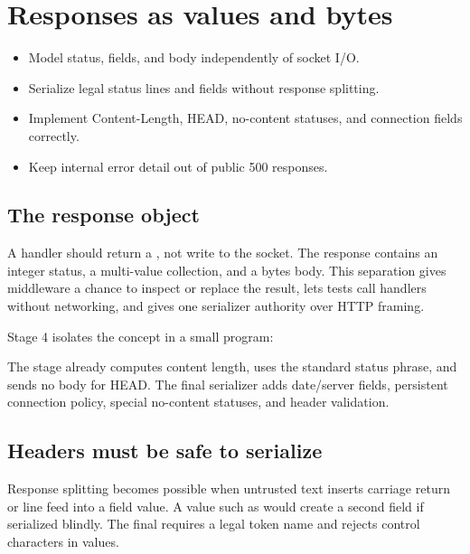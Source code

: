 \chapter{Responses as values and bytes}

\begin{objectives}
\begin{itemize}
  \item Model status, fields, and body independently of socket I/O.
  \item Serialize legal status lines and fields without response splitting.
  \item Implement Content-Length, HEAD, no-content statuses, and connection fields correctly.
  \item Keep internal error detail out of public 500 responses.
\end{itemize}
\end{objectives}

\section{The response object}

A handler should return a , not write to the socket. The response
contains an integer status, a multi-value  collection, and a bytes
body. This separation gives middleware a chance to inspect or replace the result,
lets tests call handlers without networking, and gives one serializer authority
over HTTP framing.

Stage 4 isolates the concept in a small program:


The stage already computes content length, uses the standard status phrase, and
sends no body for HEAD. The final serializer adds date/server fields, persistent
connection policy, special no-content statuses, and header validation.

\section{Headers must be safe to serialize}

Response splitting becomes possible when untrusted text inserts carriage return
or line feed into a field value. A value such as
 would create a second field if serialized
blindly. The final  requires a legal token name and rejects
control characters in values.


